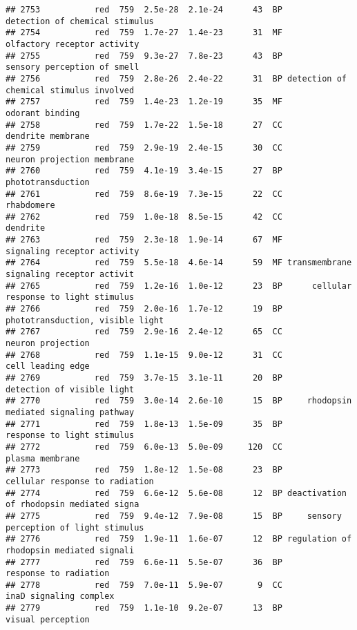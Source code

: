\documentclass[]{article}
\begin{document}
\begin{verbatim}
## 2753           red  759  2.5e-28  2.1e-24      43  BP           detection of chemical stimulus
## 2754           red  759  1.7e-27  1.4e-23      31  MF              olfactory receptor activity
## 2755           red  759  9.3e-27  7.8e-23      43  BP              sensory perception of smell
## 2756           red  759  2.8e-26  2.4e-22      31  BP detection of chemical stimulus involved 
## 2757           red  759  1.4e-23  1.2e-19      35  MF                          odorant binding
## 2758           red  759  1.7e-22  1.5e-18      27  CC                        dendrite membrane
## 2759           red  759  2.9e-19  2.4e-15      30  CC               neuron projection membrane
## 2760           red  759  4.1e-19  3.4e-15      27  BP                        phototransduction
## 2761           red  759  8.6e-19  7.3e-15      22  CC                               rhabdomere
## 2762           red  759  1.0e-18  8.5e-15      42  CC                                 dendrite
## 2763           red  759  2.3e-18  1.9e-14      67  MF              signaling receptor activity
## 2764           red  759  5.5e-18  4.6e-14      59  MF transmembrane signaling receptor activit
## 2765           red  759  1.2e-16  1.0e-12      23  BP      cellular response to light stimulus
## 2766           red  759  2.0e-16  1.7e-12      19  BP         phototransduction, visible light
## 2767           red  759  2.9e-16  2.4e-12      65  CC                        neuron projection
## 2768           red  759  1.1e-15  9.0e-12      31  CC                        cell leading edge
## 2769           red  759  3.7e-15  3.1e-11      20  BP               detection of visible light
## 2770           red  759  3.0e-14  2.6e-10      15  BP     rhodopsin mediated signaling pathway
## 2771           red  759  1.8e-13  1.5e-09      35  BP               response to light stimulus
## 2772           red  759  6.0e-13  5.0e-09     120  CC                          plasma membrane
## 2773           red  759  1.8e-12  1.5e-08      23  BP           cellular response to radiation
## 2774           red  759  6.6e-12  5.6e-08      12  BP deactivation of rhodopsin mediated signa
## 2775           red  759  9.4e-12  7.9e-08      15  BP     sensory perception of light stimulus
## 2776           red  759  1.9e-11  1.6e-07      12  BP regulation of rhodopsin mediated signali
## 2777           red  759  6.6e-11  5.5e-07      36  BP                    response to radiation
## 2778           red  759  7.0e-11  5.9e-07       9  CC                   inaD signaling complex
## 2779           red  759  1.1e-10  9.2e-07      13  BP                        visual perception

\end{verbatim}
\end{document}
